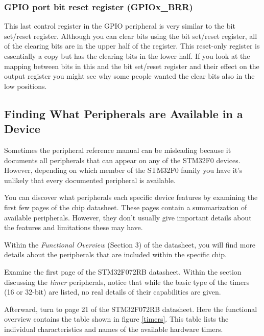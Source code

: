 \documentclass[11pt,fleqn]{book} %
\begin{document}
\subsubsection{GPIO port bit reset register (GPIOx\_BRR)}
This last control register in the GPIO peripheral is very similar to the bit set/reset register. Although you can clear bits using the bit set/reset register, all of the clearing bits are in the upper half of the register. This reset-only register is essentially a copy but has the clearing bits in the lower half. If you look at the mapping between bits in this and the bit set/reset register and their effect on the output register you might see why some people wanted the clear bits also in the low positions.

\subsection{Finding What Peripherals are Available in a Device}

Sometimes the peripheral reference manual can be misleading because it documents all peripherals that can appear on any of the STM32F0 devices. However, depending on which member of the STM32F0 family you have it's unlikely that every documented peripheral is available.

You can discover what peripherals each specific device features by examining the first few pages of the chip datasheet. These pages contain a summarization of available peripherals. However, they don't usually give important details about the features and limitations these may have. 

Within the \textit{Functional Overview} (Section 3) of the datasheet, you will find more details about the peripherals that are included within the specific chip. 

\begin{example}
    Examine the first page of the STM32F072RB datasheet. Within the section discussing the \textit{timer} peripherals, notice that while the basic type of the timers (16 or 32-bit) are listed, no real details of their capabilities are given. 
    
    Afterward, turn to page 21 of the STM32F072RB datasheet. Here the functional overview contains the table shown in figure \ref{timers}. This table lists the individual characteristics and names of the available hardware timers.
\end{example}
\end{document}
